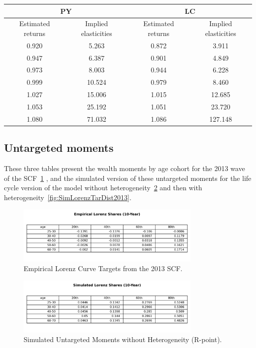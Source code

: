 \begin{center}
\begin{tabular}{|c|c|c|c|}
\hline
\multicolumn{2}{|c|}{PY} & \multicolumn{2}{|c|}{LC} \\
\hline
Estimated returns & Implied elasticities & Estimated returns & Implied elasticities \\
\hline
0.920 & 5.263 & 0.872 & 3.911 \\
0.947 & 6.387 & 0.901 & 4.849 \\
0.973 & 8.003 & 0.944 & 6.228 \\
0.999 & 10.524 & 0.979 & 8.460 \\
1.027 & 15.006 & 1.015 & 12.685 \\
1.053 & 25.192 & 1.051 & 23.720 \\
1.080 & 71.032 & 1.086 & 127.148 \\
\hline
\end{tabular}
\end{center}


\subsection{Untargeted moments}

\par These three tables present the wealth moments by age cohort for the 2013 wave of the SCF~\ref{fig:EmpLorenzTar2013} , and the simulated version of these untargeted moments for the life cycle version of the model without heterogeneity~\ref{fig:SimLorenzTarPoint2013} and then with heterogeneity~\ref{fig:SimLorenzTarDist2013}.

\begin{figure}[h]
\centering
\includegraphics[width=0.8\textwidth]{Tables/Emp_Lorenz_10yr_LCrrDistNetWorth_2013.png}
\caption{Empirical Lorenz Curve Targets from the 2013 SCF.}
\label{fig:EmpLorenzTar2013}
\end{figure}

\begin{figure}[htbp]
\centering
\includegraphics[width=0.8\textwidth]{Tables/Sim_Lorenz_10yr_LCrrPointNetWorth_2013.png}
\caption{Simulated Untargeted Moments without Heterogeneity (R-point).}
\label{fig:SimLorenzTarPoint2013}
\end{figure}

